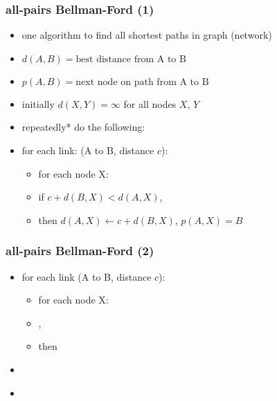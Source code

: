 \usetikzlibrary{arrows.meta,matrix}
\begin{frame}
\frametitle{all-pairs Bellman-Ford (1)}
    \begin{itemize}
    \item one algorithm to find all shortest paths in graph (network)
    \vspace{.5cm}
    \item $d(A,B) = \text{best distance from A to B}$
    \item $p(A,B) = \text{next node on path from A to B}$
    \item initially $d(X,Y) = \infty$ for all nodes $X$, $Y$
    \item repeatedly* do the following:
    \vspace{.5cm}
    \item for each link: (A to B, distance $c$):
        \begin{itemize}
        \item for each node X:
        \item if $c + d(B, X) < d(A, X)$, \\
        \item then $d(A,X) \leftarrow c+d(B,X)$, $p(A,X) = B$
        \end{itemize}
    \end{itemize}
\end{frame}

\begin{frame}
\frametitle{all-pairs Bellman-Ford (2)}
    \begin{itemize}
        \item for each link (A to B, distance $c$):
        \begin{itemize}
        \item for each node X:
        \item {}, \\
        \item then 
        \end{itemize}
    \vspace{.5cm}
    \item<2->
         \\
    \item<3->
    \end{itemize}
\end{frame}

